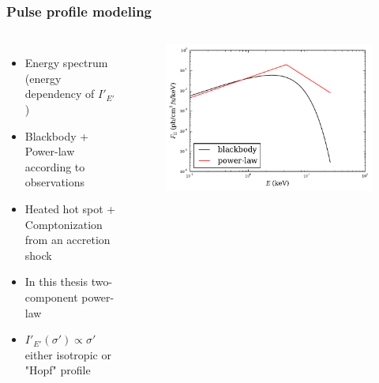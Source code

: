 \documentclass{beamer}
\begin{document}




\begin{frame}
\frametitle{Pulse profile modeling}
\begin{columns}[t] %
\begin{itemize}

\item Energy spectrum (energy dependency of $I'_{E'}$)
\item Blackbody + Power-law according to observations
\item Heated hot spot + Comptonization from an accretion shock
\item In this thesis two-component power-law 
\item $I'_{E'}(\sigma') \propto \sigma'$ either isotropic or "Hopf" profile

\end{itemize}
\begin{figure}
\includegraphics[width=1.1\linewidth]{spectrum_numflux0.pdf}
\end{figure}
\end{columns}
\end{frame}

\end{document}
